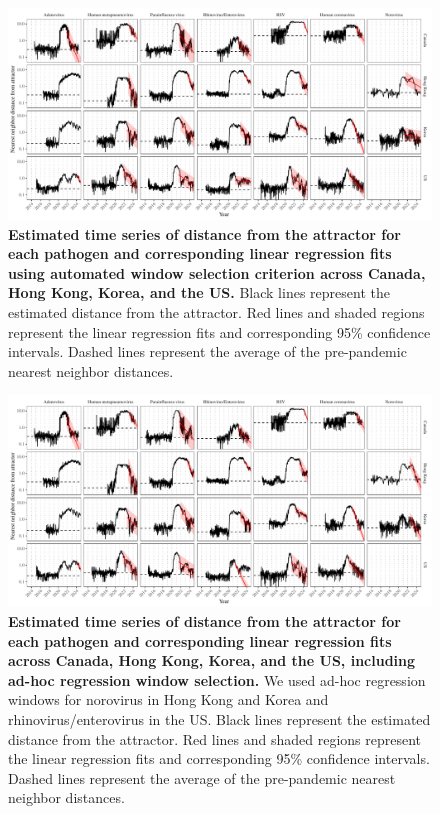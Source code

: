 \documentclass[12pt]{article}
\begin{document}
\begin{figure}[!th]
\includegraphics[width=\textwidth]{../figure4/figure4_dist_auto.pdf}
\caption{
\textbf{Estimated time series of distance from the attractor for each pathogen and corresponding linear regression fits using automated window selection criterion across Canada, Hong Kong, Korea, and the US.}
Black lines represent the estimated distance from the attractor.
Red lines and shaded regions represent the linear regression fits and corresponding 95\% confidence intervals.
Dashed lines represent the average of the pre-pandemic nearest neighbor distances.
}
\end{figure}

\pagebreak

\begin{figure}[!th]
\includegraphics[width=\textwidth]{../figure4/figure4_dist.pdf}
\caption{
\textbf{Estimated time series of distance from the attractor for each pathogen and corresponding linear regression fits across Canada, Hong Kong, Korea, and the US, including ad-hoc regression window selection.}
We used ad-hoc regression windows for norovirus in Hong Kong and Korea and rhinovirus/enterovirus in the US.
Black lines represent the estimated distance from the attractor.
Red lines and shaded regions represent the linear regression fits and corresponding 95\% confidence intervals.
Dashed lines represent the average of the pre-pandemic nearest neighbor distances.
}
\end{figure}
\end{document}
